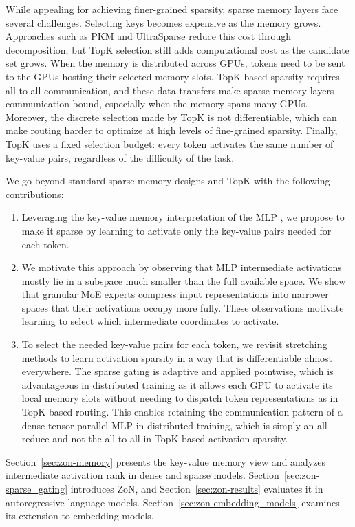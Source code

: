 While appealing for achieving finer-grained sparsity, sparse memory layers
face several challenges. Selecting keys becomes expensive as the memory grows.
Approaches such as PKM \citep{lample2019largememorylayersproduct} 
and UltraSparse \citep{huang2025ultrasparsememorynetwork} reduce this cost through decomposition,
but TopK selection still adds computational cost as the candidate set grows.
When the memory is distributed across GPUs, tokens need to be sent to
the GPUs hosting their selected memory slots. 
TopK-based sparsity requires all-to-all communication, and these data transfers make sparse
memory layers communication-bound, especially when the memory spans many GPUs.
Moreover, the discrete selection made by TopK is not differentiable,
which can make routing harder to optimize at high levels of fine-grained sparsity.
Finally, TopK uses a fixed selection budget: every token activates the same number of
key-value pairs, regardless of the difficulty of the task.

We go beyond standard sparse memory designs and TopK with the following contributions:
\begin{enumerate}
    \item Leveraging the key-value memory interpretation of the MLP \citep{geva-etal-2021-transformer}, 
    we propose to make it sparse by learning to activate only the key-value pairs needed for each token.
    \item We motivate this approach by observing that MLP intermediate activations mostly lie
    in a subspace much smaller than the full available space.
    We show that granular MoE experts compress input representations into narrower
    spaces that their activations occupy more fully. These observations
    motivate learning to select which intermediate coordinates to activate.
    \item To select the needed key-value pairs for each token, we revisit stretching
    methods to learn activation sparsity in a way that is differentiable almost everywhere.
    The sparse gating is adaptive and applied pointwise, which is advantageous
    in distributed training as it allows each GPU to activate
    its local memory slots without needing to dispatch token representations as in TopK-based routing.
    This enables retaining the communication pattern of a dense tensor-parallel MLP in distributed training,
    which is simply an all-reduce and not the all-to-all in TopK-based activation sparsity.
\end{enumerate}
Section~\ref{sec:zon-memory} presents the key-value memory view and analyzes
intermediate activation rank in dense and sparse models.
Section~\ref{sec:zon-sparse_gating} introduces ZoN, and
Section~\ref{sec:zon-results} evaluates it in autoregressive language models.
Section~\ref{sec:zon-embedding_models} examines its extension to embedding models.

